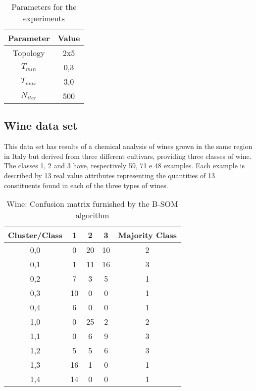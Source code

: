 \documentclass[10pt, conference, compsocconf]{IEEEtran}
\begin{document}
\begin{table}[!h]
\renewcommand{\arraystretch}{1.2}
\begin{center}
\caption{Parameters for the experiments}
\label{param}
\begin{tabular}{|c|c|}
\hline
Parameter & Value\\
\hline
Topology & 2x5\\ \hline
$T_{min}$ & 0,3\\ \hline
$T_{max}$ & 3,0\\ \hline
$N_{iter}$ & 500\\ \hline
\end{tabular}
\end{center}
\end{table}

\subsection{Wine data set}

This data set has results of a chemical analysis of wines grown in the same region in Italy but derived from three different cultivars, providing three classes of wine. The classes 1, 2 and 3 have, respectively 59, 71 e 48 examples. Each example is described by 13 real value attributes representing the quantities of 13 constituents found in each of the three types of wines.

\begin{table}[!h]
\renewcommand{\arraystretch}{1.2}
\begin{center}
\caption{Wine: Confusion matrix furnished by the B-SOM algorithm}
\begin{tabular}{|c|c|c|c||c|}
\hline
Cluster/Class & 1 & 2 & 3 & Majority Class \\ \hline
0,0 & 0 & 20 & 10 & 2 \\ \hline
0,1 & 1 & 11 & 16 & 3\\ \hline
0,2 & 7 & 3 & 5 & 1\\ \hline
0,3 & 10 & 0 & 0 & 1\\ \hline
0,4 & 6 & 0 & 0 & 1\\ \hline \hline
1,0 & 0 & 25 & 2 & 2\\ \hline
1,1 & 0 & 6 & 9 & 3\\ \hline
1,2 & 5 & 5 & 6 & 3\\ \hline
1,3 & 16 & 1 & 0 & 1\\ \hline 
1,4 & 14 & 0 & 0 & 1\\ \hline
\end{tabular}
\label{wine_batch}
\end{center}
\end{table}
\end{document}
